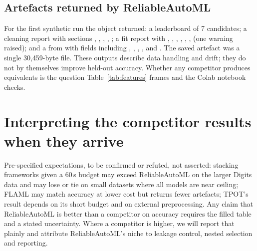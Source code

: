 \documentclass[conference]{IEEEtran}
\begin{document}
\subsection{Artefacts returned by ReliableAutoML}
For the first synthetic run the object returned: a leaderboard of 7 candidates; a cleaning report with sections , , , , ; a fit report with , , , , , ,  (one warning raised); and a  from  with fields including , , , ,  and . The saved artefact was a single 30{,}459-byte file. These outputs describe data handling and drift; they do not by themselves improve held-out accuracy. Whether any competitor produces equivalents is the question Table~\ref{tab:features} frames and the Colab notebook checks.

\section{Interpreting the competitor results when they arrive}
Pre-specified expectations, to be confirmed or refuted, not asserted: stacking frameworks given a 60\,s budget may exceed ReliableAutoML on the larger Digits data and may lose or tie on small datasets where all models are near ceiling; FLAML may match accuracy at lower cost but returns fewer artefacts; TPOT's result depends on its short budget and on external preprocessing. Any claim that ReliableAutoML is better than a competitor on accuracy requires the filled table and a stated uncertainty. Where a competitor is higher, we will report that plainly and attribute ReliableAutoML's niche to leakage control, nested selection and reporting.
\end{document}
